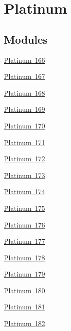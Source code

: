 \hypertarget{group___isotope_const-_platinum}{}\section{Platinum}
\label{group___isotope_const-_platinum}
\subsection*{Modules}
\begin{DoxyCompactItemize}
\item 
\mbox{\hyperlink{group___isotope_const-_platinum-_pt166}{Platinum 166}}
\item 
\mbox{\hyperlink{group___isotope_const-_platinum-_pt167}{Platinum 167}}
\item 
\mbox{\hyperlink{group___isotope_const-_platinum-_pt168}{Platinum 168}}
\item 
\mbox{\hyperlink{group___isotope_const-_platinum-_pt169}{Platinum 169}}
\item 
\mbox{\hyperlink{group___isotope_const-_platinum-_pt170}{Platinum 170}}
\item 
\mbox{\hyperlink{group___isotope_const-_platinum-_pt171}{Platinum 171}}
\item 
\mbox{\hyperlink{group___isotope_const-_platinum-_pt172}{Platinum 172}}
\item 
\mbox{\hyperlink{group___isotope_const-_platinum-_pt173}{Platinum 173}}
\item 
\mbox{\hyperlink{group___isotope_const-_platinum-_pt174}{Platinum 174}}
\item 
\mbox{\hyperlink{group___isotope_const-_platinum-_pt175}{Platinum 175}}
\item 
\mbox{\hyperlink{group___isotope_const-_platinum-_pt176}{Platinum 176}}
\item 
\mbox{\hyperlink{group___isotope_const-_platinum-_pt177}{Platinum 177}}
\item 
\mbox{\hyperlink{group___isotope_const-_platinum-_pt178}{Platinum 178}}
\item 
\mbox{\hyperlink{group___isotope_const-_platinum-_pt179}{Platinum 179}}
\item 
\mbox{\hyperlink{group___isotope_const-_platinum-_pt180}{Platinum 180}}
\item 
\mbox{\hyperlink{group___isotope_const-_platinum-_pt181}{Platinum 181}}
\item 
\mbox{\hyperlink{group___isotope_const-_platinum-_pt182}{Platinum 182}}
\item 

\end{DoxyCompactItemize}
